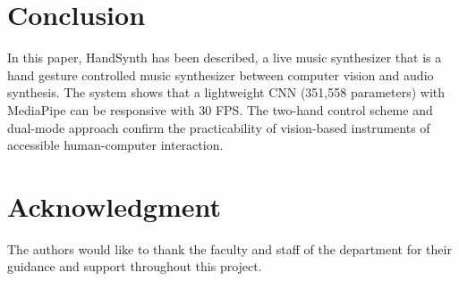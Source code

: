 \documentclass[conference]{IEEEtran}
\begin{document}
\section{Conclusion}

In this paper, HandSynth has been described, a live music synthesizer that is a hand gesture controlled music synthesizer between computer vision and audio synthesis. The system shows that a lightweight CNN (351,558 parameters) with MediaPipe can be responsive with 30 FPS. The two-hand control scheme and dual-mode approach confirm the practicability of vision-based instruments of accessible human-computer interaction.

\section*{Acknowledgment}

The authors would like to thank the faculty and staff of the department for their guidance and support throughout this project.
\end{document}
